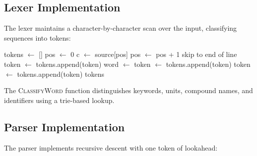 \documentclass[twocolumn,10pt]{article}
\begin{document}
\subsection{Lexer Implementation}

The lexer maintains a character-by-character scan over the input, classifying sequences into tokens:

\begin{algorithm}
\caption{CatScript Lexer}
\begin{algorithmic}[1]
    \State tokens $\gets$ []
    \State pos $\gets$ 0
        \State c $\gets$ source[pos]
            \State pos $\gets$ pos + 1
            \State skip to end of line
            \State token $\gets$ 
            \State tokens.append(token)
            \State word $\gets$ 
            \State token $\gets$ 
            \State tokens.append(token)
        \Else
            \State token $\gets$ 
            \State tokens.append(token)
        \EndIf
    \EndWhile
    \State \Return tokens
\EndFunction
\end{algorithmic}
\end{algorithm}

The \textsc{ClassifyWord} function distinguishes keywords, units, compound names, and identifiers using a trie-based lookup.

\subsection{Parser Implementation}

The parser implements recursive descent with one token of lookahead:

\begin{algorithm}
\caption{CatScript Parser (Statement Level)}
\begin{algorithmic}[1]
            \State \Return {}
        \EndCase
            \State \Return {}
        \EndCase
            \State \Return {}
        \EndCase
            \State \Return {}
        \EndCase
            \State \Return {}
        \EndCase
            \State \Return {}
        \EndCase
            \State \Return {}
        \EndCase
            \State \Return {}
        \EndCase
    \EndSwitch
\EndFunction
\end{algorithmic}
\end{algorithm}
\end{document}
